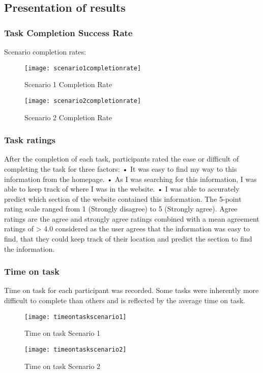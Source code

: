 \subsection{Presentation of results}
\subsubsection{Task Completion Success Rate}
Scenario completion rates: 
\begin{figure}[h!]
    \centering
        \texttt{[image: scenario1completionrate]}
    \caption{Scenario 1 Completion Rate}
    \label{scenario1completionrate}
\end{figure}
\begin{figure}[h!]
    \centering
        \texttt{[image: scenario2completionrate]}
    \caption{Scenario 2 Completion Rate}
    \label{scenario2completionrate}
\end{figure}

\subsubsection{Task ratings}
After the completion of each task, participants rated the ease or difficult of completing the task for three factors:
• It was easy to find my way to this information from the homepage.
• As I was searching for this information, I was able to keep track of where I was in the website.
• I was able to accurately predict which section of the website contained this information.
The 5-point rating scale ranged from 1 (Strongly disagree) to 5 (Strongly agree). Agree ratings are the agree and strongly agree ratings combined with a mean agreement ratings of > 4.0 considered as the user agrees that the information was easy to find, that they could keep track of their location and predict the section to find the information.

\subsubsection{Time on task}
Time on task for each participant was recorded. Some tasks were inherently more difficult to complete than others and is reflected by the average time on task.
\begin{figure}[h!]
    \centering
        \texttt{[image: timeontaskscenario1]}
    \caption{Time on task Scenario 1}
    \label{timeontaskscenario1}
\end{figure}
\begin{figure}[h!]
    \centering
        \texttt{[image: timeontaskscenario2]}
    \caption{Time on task Scenario 2}
    \label{timeontaskscenario2}
\end{figure}

